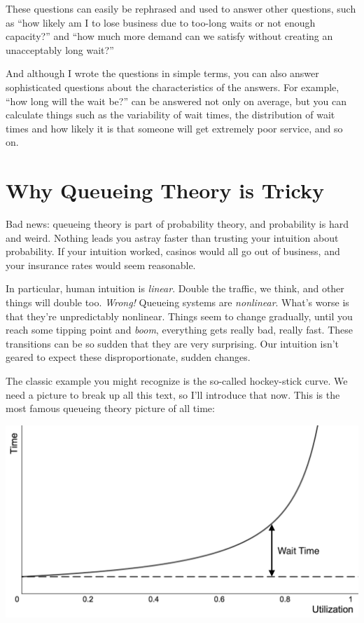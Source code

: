 \documentclass{vivid_layout_pdf}
\begin{document}
These questions can easily be rephrased and used to answer other questions, such as ``how likely am I to lose business due to too-long waits or not enough capacity?'' and ``how much more demand can we satisfy without creating an unacceptably long wait?''

And although I wrote the questions in simple terms, you can also answer sophisticated questions about the characteristics of the answers. For example, ``how long will the wait be?'' can be answered not only on average, but you can calculate things such as the variability of wait times, the distribution of wait times and how likely it is that someone will get extremely poor service, and so on.

\section{Why Queueing Theory is Tricky}

Bad news: queueing theory is part of probability theory, and probability is hard and weird. Nothing leads you astray faster than trusting your intuition about probability. If your intuition worked, casinos would all go out of business, and your insurance rates would seem reasonable.

In particular, human intuition is {\itshape linear}. Double the traffic, we think, and other things will double too. {\itshape Wrong!} Queueing systems are {\itshape nonlinear}. What's worse is that they're unpredictably nonlinear. Things seem to change gradually, until you reach some tipping point and {\itshape boom}, everything gets really bad, really fast. These transitions can be so sudden that they are very surprising. Our intuition isn't geared to expect these disproportionate, sudden changes.

The classic example you might recognize is the so-called hockey-stick curve. We need a picture to break up all this text, so I'll introduce that now. This is the most famous queueing theory picture of all time:

\begin{center}
\includegraphics[width=.75\linewidth]{queueing-theory/hockey-stick-1}
\end{center}
\end{document}
